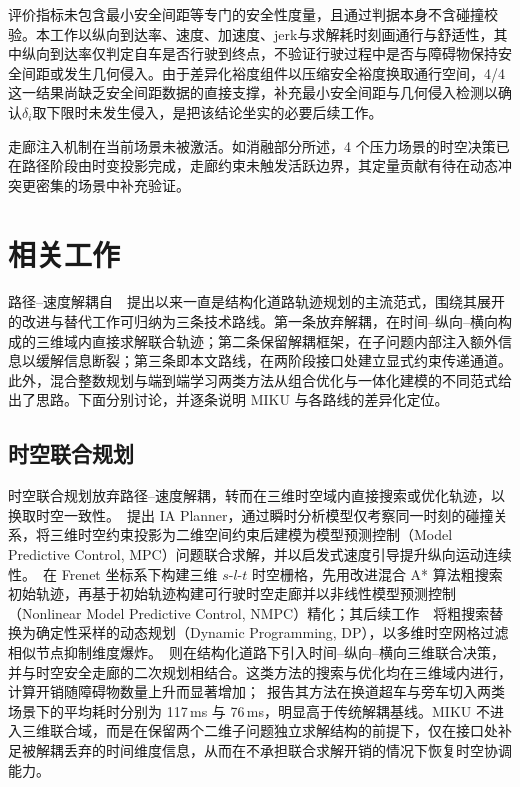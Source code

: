 \documentclass[a4paper,11pt]{ctexart}
\theoremstyle{definition}
\begin{document}
评价指标未包含最小安全间距等专门的安全性度量，且通过判据本身不含碰撞校验。本工作以纵向到达率、速度、加速度、jerk与求解耗时刻画通行与舒适性，其中纵向到达率仅判定自车是否行驶到终点，不验证行驶过程中是否与障碍物保持安全间距或发生几何侵入。由于差异化裕度组件以压缩安全裕度换取通行空间，4/4 这一结果尚缺乏安全间距数据的直接支撑，补充最小安全间距与几何侵入检测以确认$\delta_i$取下限时未发生侵入，是把该结论坐实的必要后续工作。

走廊注入机制在当前场景未被激活。如消融部分所述，4 个压力场景的时空决策已在路径阶段由时变投影完成，走廊约束未触发活跃边界，其定量贡献有待在动态冲突更密集的场景中补充验证。

\section{相关工作}
\label{sec:related}

路径--速度解耦自~\citet{kant1986pvd}~提出以来一直是结构化道路轨迹规划的主流范式，围绕其展开的改进与替代工作可归纳为三条技术路线。第一条放弃解耦，在时间--纵向--横向构成的三维域内直接求解联合轨迹；第二条保留解耦框架，在子问题内部注入额外信息以缓解信息断裂；第三条即本文路线，在两阶段接口处建立显式约束传递通道。此外，混合整数规划与端到端学习两类方法从组合优化与一体化建模的不同范式给出了思路。下面分别讨论，并逐条说明 MIKU 与各路线的差异化定位。

\subsection{时空联合规划}
\label{sec:related-joint}

时空联合规划放弃路径--速度解耦，转而在三维时空域内直接搜索或优化轨迹，以换取时空一致性。\citet{yang2021_ia_planner}~提出 IA Planner，通过瞬时分析模型仅考察同一时刻的碰撞关系，将三维时空约束投影为二维空间约束后建模为模型预测控制（Model Predictive Control, MPC）问题联合求解，并以启发式速度引导提升纵向运动连续性。\citet{hu2023_hybrid_astar_slt}~在 Frenet 坐标系下构建三维 $s$-$l$-$t$ 时空栅格，先用改进混合 A* 算法粗搜索初始轨迹，再基于初始轨迹构建可行驶时空走廊并以非线性模型预测控制（Nonlinear Model Predictive Control, NMPC）精化；其后续工作~\citep{hu2025_dp_nmpc}~将粗搜索替换为确定性采样的动态规划（Dynamic Programming, DP），以多维时空网格过滤相似节点抑制维度爆炸。\citet{qiao2025stjoint}~则在结构化道路下引入时间--纵向--横向三维联合决策，并与时空安全走廊的二次规划相结合。这类方法的搜索与优化均在三维域内进行，计算开销随障碍物数量上升而显著增加；\citet{hu2023_hybrid_astar_slt}~报告其方法在换道超车与旁车切入两类场景下的平均耗时分别为 117\,ms 与 76\,ms，明显高于传统解耦基线。MIKU 不进入三维联合域，而是在保留两个二维子问题独立求解结构的前提下，仅在接口处补足被解耦丢弃的时间维度信息，从而在不承担联合求解开销的情况下恢复时空协调能力。
\end{document}
